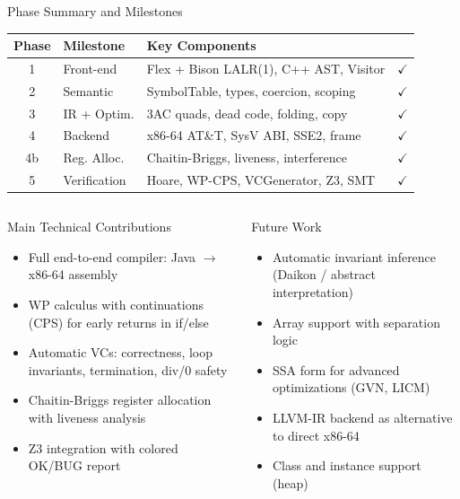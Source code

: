 \documentclass[aspectratio=169,11pt]{beamer}
\begin{document}
\begin{frame}{Phase Summary and Milestones}
\begin{table}
  \small
  \begin{tabular}{clll}
    \toprule
    \textbf{Phase} & \textbf{Milestone} & \textbf{Key Components} & \\
    \midrule
    1  & Front-end      & Flex + Bison LALR(1), C++ AST, Visitor  & {\color{accent}$\checkmark$} \\
    2  & Semantic       & SymbolTable, types, coercion, scoping   & {\color{accent}$\checkmark$} \\
    3  & IR + Optim.    & 3AC quads, dead code, folding, copy     & {\color{accent}$\checkmark$} \\
    4  & Backend        & x86-64 AT\&T, SysV ABI, SSE2, frame    & {\color{accent}$\checkmark$} \\
    4b & Reg. Alloc.    & Chaitin-Briggs, liveness, interference  & {\color{accent}$\checkmark$} \\
    5  & Verification   & Hoare, WP-CPS, VCGenerator, Z3, SMT    & {\color{accent}$\checkmark$} \\
    \bottomrule
  \end{tabular}
\end{table}

\begin{columns}[t]
  \begin{block}{Main Technical Contributions}
    \begin{itemize}\small
      \item Full end-to-end compiler: Java $\to$ x86-64 assembly
      \item WP calculus with continuations (CPS) for early returns in if/else
      \item Automatic VCs: correctness, loop invariants, termination, div/0 safety
      \item Chaitin-Briggs register allocation with liveness analysis
      \item Z3 integration with colored OK/BUG report
    \end{itemize}
  \end{block}

  \begin{alertblock}{Future Work}
    \begin{itemize}\small
      \item Automatic invariant inference (Daikon / abstract interpretation)
      \item Array support with separation logic
      \item SSA form for advanced optimizations (GVN, LICM)
      \item LLVM-IR backend as alternative to direct x86-64
      \item Class and instance support (heap)
    \end{itemize}
  \end{alertblock}
\end{columns}
\end{frame}
\end{document}
